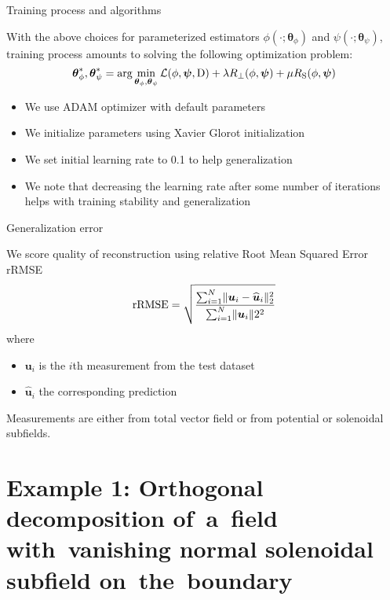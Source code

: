 \documentclass[11pt,aspectratio=169,t]{beamer}
\renewcommand{\vec}[1]{\boldsymbol{#1}}
\newcommand{\VTheta}{\ensuremath{\vec{\theta}}}
\DeclarePairedDelimiter\norm{\lVert}{\rVert}
\renewcommand{\hat}{\widehat}
\begin{document}
\begin{frame}{Training process and algorithms}

With the above choices for parameterized estimators $\phi(\cdot; \VTheta_{\phi})$
and $\psi(\cdot; \VTheta_{\psi})$, training process amounts to solving the following
optimization problem:
\[
\VTheta_{\phi}^{*}, \VTheta_{\psi}^{*} =
\arg \min_{\VTheta_\phi, \VTheta_\psi} \mathcal L(\phi, \vec \psi, \mathrm D)
  + \lambda R_{\perp}(\phi, \vec \psi) + \mu R_{\text S}(\phi, \vec \psi)
\]

\begin{itemize}
    \item We use ADAM optimizer with default parameters
    \item We initialize parameters using Xavier Glorot initialization
    \item We set initial learning rate to 0.1 to help generalization
    \item We note that decreasing the learning rate after some number
        of iterations helps with training stability and generalization
\end{itemize}
\end{frame}

\begin{frame}{Generalization error}

We score quality of reconstruction using relative Root Mean Squared Error rRMSE
\[
\text{rRMSE} = \sqrt{%
    \frac{%
    \sum_{i=1}^N \norm{\vec u_i - \hat{\vec u}_i}_2^2}{%
    \sum_{i=1}^N \norm{\vec u_i}2^2
    }
}
\]
where
\begin{itemize}
    \item $\vec u_{i}$ is the $i$th measurement from the test dataset
    \item $\hat{\vec u}_{i}$ the corresponding prediction
\end{itemize}

Measurements are either from total vector field
or from potential or solenoidal subfields.
\end{frame}

\section{Example 1: Orthogonal decomposition of~a~field with~vanishing normal solenoidal subfield on~the~boundary}
\end{document}
